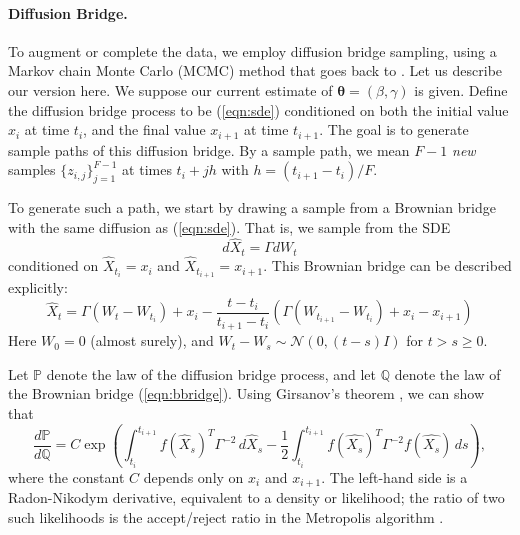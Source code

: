\documentclass{article}
\newcommand{\btheta}{\ensuremath{\bm{\theta}}}
\begin{document}
\paragraph{Diffusion Bridge.} To augment or complete the data, we employ diffusion bridge sampling, using a Markov chain Monte Carlo (MCMC) method that goes back to \cite{roberts_inference_2001, papaspiliopoulos_data_2013}.  Let us describe our version here.  We suppose our current estimate of $\btheta = (\beta, \gamma)$ is given.  Define the diffusion bridge process to be (\ref{eqn:sde}) conditioned on both the initial value $x_i$ at time $t_i$, and the final value $x_{i+1}$ at time $t_{i+1}$.  The goal is to generate sample paths of this diffusion bridge.  By a sample path, we mean $F-1$ \emph{new} samples $\{z_{i,j}\}_{j=1}^{F-1}$ at times $t_i + j h$ with $h = (t_{i+1} - t_i)/F$.

To generate such a path, we start by drawing a sample from a Brownian bridge with the same diffusion as (\ref{eqn:sde}).  That is, we sample from the SDE
\begin{equation}
\label{eqn:bbridgesde}
d\widehat{X}_t = \Gamma dW_t
\end{equation}
conditioned on $\widehat{X}_{t_i} = x_i$ and $\widehat{X}_{t_{i+1}} = x_{i+1}$.  This Brownian bridge can be described explicitly:
\begin{equation}
\label{eqn:bbridge}
\widehat{X}_t = \Gamma (W_{t} - W_{t_i}) + x_i - \frac{t - t_i}{t_{i+1} - t_i} (\Gamma (W_{t_{i+1}} - W_{t_i}) + x_{i} - x_{i+1} )
\end{equation}
Here $W_0 = 0$ (almost surely), and $W_t - W_s \sim \mathcal{N}(0, (t-s)I)$ for $t > s \geq 0$. 

Let $\mathbb{P}$ denote the law of the diffusion bridge process, and let $\mathbb{Q}$ denote the law of the Brownian bridge (\ref{eqn:bbridge}).  Using Girsanov's theorem \cite{papaspiliopoulos_importance_2012}, we can show that
\begin{equation}
\label{eqn:ratio}
\frac{d \mathbb{P}}{d \mathbb{Q}} = C \exp \left( \int_{t_i}^{t_{i+1}} f(\widehat{X}_s)^T \Gamma^{-2} \, d \widehat{X}_s - \frac{1}{2} \int_{t_i}^{t_{i+1}} f(\widehat{X_s})^T \Gamma^{-2} f(\widehat{X_s}) \, ds \right),
\end{equation}
where the constant $C$ depends only on $x_i$ and $x_{i+1}$.  The left-hand side is a Radon-Nikodym derivative, equivalent to a density or likelihood; the ratio of two such likelihoods is the accept/reject ratio in the Metropolis algorithm 
\cite{stuart_inverse_2010}.
\end{document}
